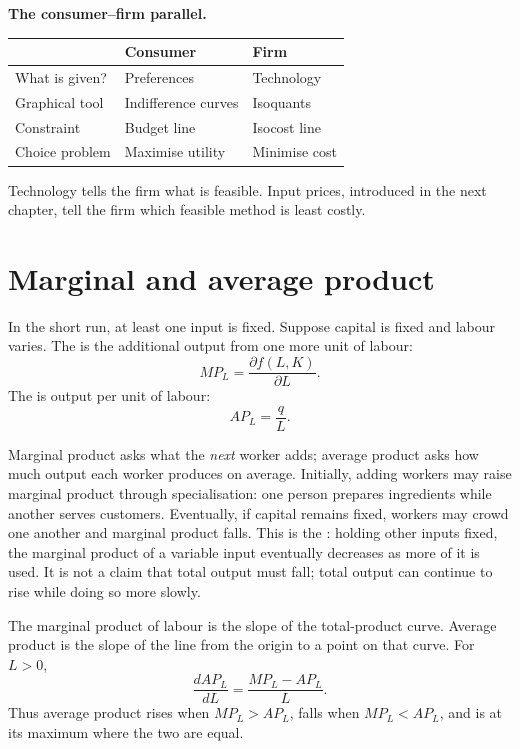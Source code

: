 \begin{keyidea}
\textbf{The consumer--firm parallel.}
\begin{center}
\begin{tabular}{lll}
\toprule
& Consumer & Firm \\
\midrule
What is given? & Preferences & Technology \\
Graphical tool & Indifference curves & Isoquants \\
Constraint & Budget line & Isocost line \\
Choice problem & Maximise utility & Minimise cost \\
\bottomrule
\end{tabular}
\end{center}
Technology tells the firm what is feasible. Input prices, introduced in the
next chapter, tell the firm which feasible method is least costly.
\end{keyidea}

\section{Marginal and average product}

In the short run, at least one input is fixed. Suppose capital is fixed and labour varies. The  is the additional output from one more unit of labour:
\[
MP_L=\frac{\partial f(L,K)}{\partial L}.
\]
The  is output per unit of labour:
\[
AP_L=\frac{q}{L}.
\]

Marginal product asks what the \emph{next} worker adds; average product asks
how much output each worker produces on average. Initially, adding workers may
raise marginal product through specialisation: one person prepares ingredients
while another serves customers. Eventually, if capital remains fixed, workers
may crowd one another and marginal product falls. This is the : holding other inputs fixed, the marginal
product of a variable input eventually decreases as more of it is used. It is
not a claim that total output must fall; total output can continue to rise
while doing so more slowly.

The marginal product of labour is the slope of the total-product curve.
Average product is the slope of the line from the origin to a point on that
curve. For $L>0$,
\[
\frac{dAP_L}{dL}=\frac{MP_L-AP_L}{L}.
\]
Thus average product rises when $MP_L>AP_L$, falls when $MP_L<AP_L$, and is
at its maximum where the two are equal.

